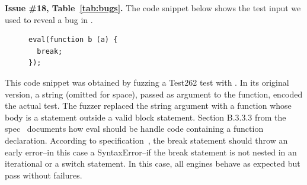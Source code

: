 \documentclass[10pt,conference,anonymous]{IEEEtran}
\begin{document}
\vspace{1ex}\noindent\textbf{Issue \#18, Table~\ref{tab:bugs}.}  The
code snippet below shows the test input we used to reveal a bug in
\veight{}.

\begin{figure}[h!]
  \centering
  \scriptsize
  \begin{lstlisting}
eval(function b (a) {
  break;
});
  \end{lstlisting}
  \normalsize
\end{figure}

This code snippet was obtained by fuzzing a Test262 test with
\quickfuzz. In its original version, a string (omitted for space),
passed as argument to the  function, encoded the actual
test. The fuzzer replaced the string argument with a function whose
body is a  statement outside a valid block
statement. Section B.3.3.3 from the spec~\cite{spec-b333} documents
how eval should be handle code containing a function declaration.
According to specification~\cite{break-statement}, the break statement
should throw an early error--in this case a SyntaxError--if the break
statement is not nested in an iterational or a switch statement. In
this case, all engines behave as expected but \veight{} pass without
failures.

\end{document}
